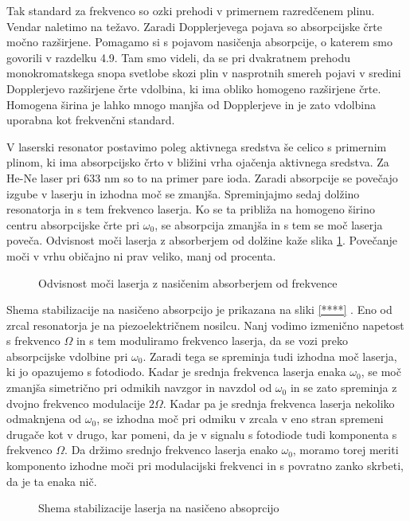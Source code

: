 Tak standard za frekvenco so ozki prehodi v primernem razredčenem plinu.
Vendar naletimo na težavo. Zaradi Dopplerjevega pojava so absorpcijske
črte močno razširjene. Pomagamo si s pojavom nasičenja absorpcije, o katerem
smo govorili v razdelku 4.9. Tam smo videli, da se pri dvakratnem prehodu
monokromatskega snopa svetlobe skozi plin v nasprotnih smereh pojavi v
sredini Dopplerjevo razširjene črte vdolbina, ki ima obliko homogeno
razširjene črte. Homogena širina je lahko mnogo manjša od Dopplerjeve in
je zato vdolbina uporabna kot frekvenčni standard.

V laserski resonator postavimo poleg aktivnega sredstva še celico s
primernim plinom, ki ima absorpcijsko črto v bližini vrha ojačenja
aktivnega sredstva. Za He-Ne laser pri 633 nm so to na primer pare ioda.
Zaradi absorpcije se povečajo izgube v laserju in izhodna moč se zmanjša.
Spreminjajmo sedaj dolžino resonatorja in s tem frekvenco laserja. Ko se ta
približa na homogeno širino centru absorpcijske črte pri $\omega_0$, se
absorpcija zmanjša in s tem se moč laserja poveča. Odvisnost moči
laserja z absorberjem od dolžine kaže slika \ref{s5.12}. Povečanje moči
v vrhu običajno ni prav veliko, manj od procenta.

\begin{figure}[tbp]
\label{s5.12} \vskip 5cm
\caption{Odvisnost moči laserja z nasičenim absorberjem od frekvence}
\end{figure}

Shema stabilizacije na nasičeno absorpcijo je prikazana na sliki \ref{****}%
. Eno od zrcal resonatorja je na piezoelektričnem nosilcu. Nanj vodimo
izmenično napetost s frekvenco $\Omega$ in s tem moduliramo frekvenco
laserja, da se vozi preko absorpcijske vdolbine pri $\omega_0$. Zaradi tega
se spreminja tudi izhodna moč laserja, ki jo opazujemo s fotodiodo. Kadar
je srednja frekvenca laserja enaka $\omega_0$, se moč zmanjša simetrično
pri odmikih navzgor in navzdol od $\omega_0$ in se zato spreminja z dvojno
frekvenco modulacije $2\Omega$. Kadar pa je srednja frekvenca laserja
nekoliko odmaknjena od $\omega_0$, se izhodna moč pri odmiku v zrcala v eno
stran spremeni drugače kot v drugo, kar pomeni, da je v signalu s fotodiode
tudi komponenta s frekvenco $\Omega$. Da držimo srednjo frekvenco laserja
enako $\omega_0$, moramo torej meriti komponento izhodne moči pri
modulacijski frekvenci in s povratno zanko skrbeti, da je ta enaka nič.

\begin{figure}[tbp]
\label{s5.13} \vskip 7cm
\caption{Shema stabilizacije laserja na nasičeno absoprcijo}
\end{figure}

